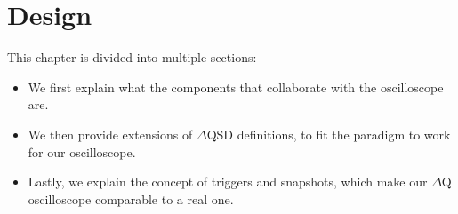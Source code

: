 \chapter{Design}
    This chapter is divided into multiple sections:
    \begin{itemize}
        \item We first explain what the components that collaborate with the oscilloscope are.
        \item We then provide extensions of $\Delta$QSD definitions, to fit the paradigm to work for our oscilloscope.
        \item Lastly, we explain the concept of triggers and snapshots, which make our $\Delta$Q oscilloscope comparable to a real one.
    \end{itemize}

    
    
    
    
    
    
